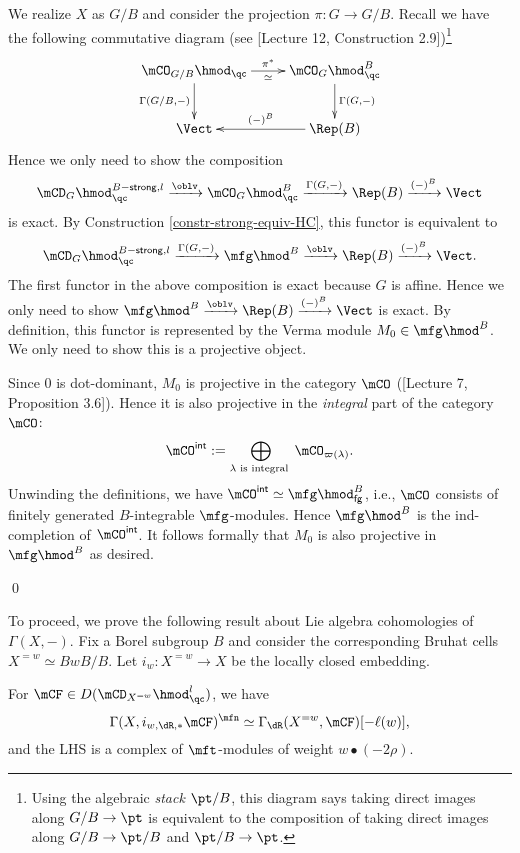 
		We realize $X$ as $G/B$ and consider the projection $\pi:G\to G/B$. Recall we have the following commutative diagram (see [Lecture 12, Construction 2.9])\footnote{Using the algebraic \emph{stack} $\pt/B$, this diagram says taking direct images along $G/B \to \pt$ is equivalent to the composition of taking direct images along $G/B \to \pt/B$ and $\pt/B \to \pt$.}
		\[
			\xymatrix{
				\mCO_{G/B} \hmod_\qc 
					\ar[r]^-{\pi^*}_-\simeq
					\ar[d]_-{\Gamma(G/B,-)}
				& \mCO_G \hmod_\qc^B
					\ar[d]^-{\Gamma(G,-)} \\
				\Vect
				& \Rep(B) \ar[l]_-{(-)^B}
			}
		\]
		Hence we only need to show the composition
		\[
			\mCD_G \hmod_\qc^{B\mathsf{-strong},l} \xrightarrow{\oblv} \mCO_G \hmod_\qc^B \xrightarrow{\Gamma(G,-)} \Rep(B) \xrightarrow{(-)^B} \Vect
		\]
		is exact. By Construction \ref{constr-strong-equiv-HC}, this functor is equivalent to
		\[
			\mCD_G \hmod_\qc^{B\mathsf{-strong},l} \xrightarrow{\Gamma(G,-)} \mfg\hmod^B \xrightarrow{\oblv} \Rep(B) \xrightarrow{(-)^B} \Vect.
		\]
		The first functor in the above composition is exact because $G$ is affine. Hence we only need to show $\mfg\hmod^B \xrightarrow{\oblv} \Rep(B) \xrightarrow{(-)^B} \Vect$ is exact. By definition, this functor is represented by the Verma module $M_0 \in \mfg\hmod^B$. We only need to show this is a projective object.

		Since $0$ is dot-dominant, $M_0$ is projective in the category $\mCO$ ([Lecture 7, Proposition 3.6]). Hence it is also projective in the \emph{integral} part of the category $\mCO$:
		\[
			\mCO^\mathsf{int}:= \bigoplus_{\lambda\textrm{ is integral }} \mCO_{\varpi(\lambda)}.
		\]
		Unwinding the definitions, we have $\mCO^\mathsf{int}\simeq \mfg\hmod_{\mathsf{fg}}^B$, i.e., $\mCO$ consists of finitely generated $B$-integrable $\mfg$-modules. Hence $\mfg\hmod^B$ is the ind-completion of $\mCO^\mathsf{int}$. It follows formally that $M_0$ is also projective in $\mfg\hmod^B$ as desired.

	\qed

	To proceed, we prove the following result about Lie algebra cohomologies of $\Gamma(X,-)$. Fix a Borel subgroup $B$ and consider the corresponding Bruhat cells $X^{=w}\simeq BwB/B$. Let $i_w: X^{=w} \to X$ be the locally closed embedding.

	\begin{prop}
		\label{prop-cal-dual-Verma}
		For $\mCF\in D(\mCD_{X^{=w}}\hmod_\qc^l)$, we have
		\begin{equation}
			\label{eqn-cal-dual-Verma}
			 \Gamma( X, i_{w,\dR,*} \mCF )^\mfn \simeq \Gamma_\dR( X^{=w}, \mCF )[-\ell(w)],
		\end{equation}
		and the LHS is a complex of $\mft$-modules of weight $w\bullet(-2\rho)$.
	\end{prop}

